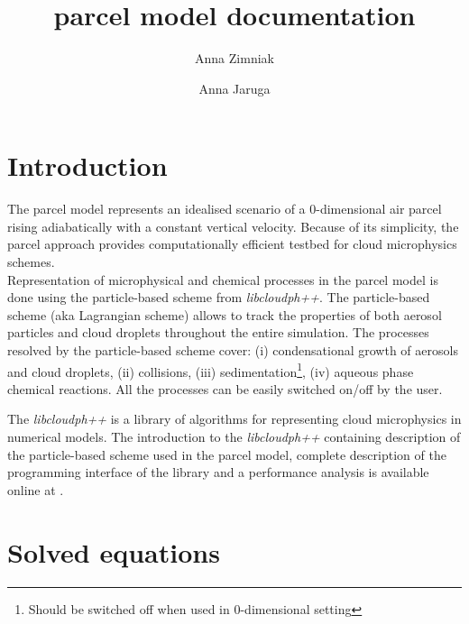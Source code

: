\documentclass[11pt]{article}
\author[1]{Anna Zimniak}
\author[1]{Anna Jaruga}
\affil[1]{Institute of Geophysics, Faculty of Physics, University of Warsaw, Poland}
\title{parcel model documentation}
\begin{document}
\maketitle
\vspace{-4em}


\section{Introduction}\label{sec:intro}

The parcel model represents an idealised scenario of a 0-dimensional air parcel rising adiabatically with a constant vertical velocity. 
Because of its simplicity, the parcel approach provides computationally efficient testbed for cloud microphysics schemes.\\

Representation of microphysical and chemical processes in the parcel model is done using the particle-based scheme from \emph{libcloudph++}.
The particle-based scheme (aka Lagrangian scheme) allows to track the properties of both 
  aerosol particles and cloud droplets throughout the entire simulation.
The processes resolved by the particle-based scheme cover:
  (i) condensational growth of aerosols and cloud droplets,
  (ii) collisions,
  (iii) sedimentation\footnote{Should be switched off when used in 0-dimensional setting},
  (iv) aqueous phase chemical reactions.
All the processes can be easily switched on/off by the user.

The \emph{libcloudph++} is a library of algorithms for representing cloud microphysics in numerical models.
The introduction to the \emph{libcloudph++} containing description of the particle-based scheme used in the parcel model, 
  complete description of the programming interface of the library and a performance analysis
  is available online at \cite{Arabas_et_al_2015}.\\

\section{Solved equations}\label{sec:eqs}
\end{document}
